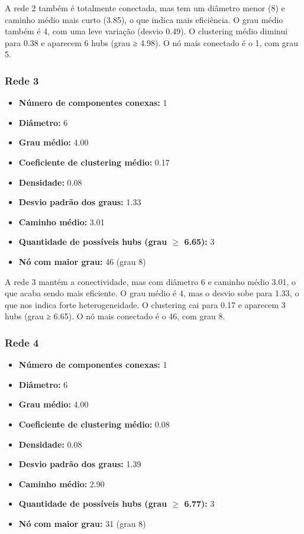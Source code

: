 \documentclass[a4paper]{article}
\begin{document}
A rede 2 também é totalmente conectada, mas tem um diâmetro menor (8) e caminho médio mais curto (3.85), o que indica mais eficiência. O grau médio também é 4, com uma leve variação (desvio 0.49). O clustering médio diminui para 0.38 e aparecem 6 hubs (grau ≥ 4.98). O nó mais conectado é o 1, com grau 5.

\subsubsection{Rede 3}
\begin{itemize}
    \item \textbf{Número de componentes conexas:} 1
    \item \textbf{Diâmetro:} 6
    \item \textbf{Grau médio:} 4.00
    \item \textbf{Coeficiente de clustering médio:} 0.17
    \item \textbf{Densidade:} 0.08
    \item \textbf{Desvio padrão dos graus:} 1.33
    \item \textbf{Caminho médio:} 3.01
    \item \textbf{Quantidade de possíveis hubs (grau $\geq$ 6.65):} 3
    \item \textbf{Nó com maior grau:} 46 (grau 8)
\end{itemize}

A rede 3 mantém a conectividade, mas com diâmetro 6 e caminho médio 3.01, o que acaba sendo mais eficiente. O grau médio é 4, mas o desvio sobe para 1.33, o que nos indica forte heterogeneidade. O clustering cai para 0.17 e aparecem 3 hubs (grau ≥ 6.65). O nó mais conectado é o 46, com grau 8.


\subsubsection{Rede 4}

\begin{itemize}
    \item \textbf{Número de componentes conexas:} 1
    \item \textbf{Diâmetro:} 6
    \item \textbf{Grau médio:} 4.00
    \item \textbf{Coeficiente de clustering médio:} 0.08
    \item \textbf{Densidade:} 0.08
    \item \textbf{Desvio padrão dos graus:} 1.39
    \item \textbf{Caminho médio:} 2.90
    \item \textbf{Quantidade de possíveis hubs (grau $\geq$ 6.77):} 3
    \item \textbf{Nó com maior grau:} 31 (grau 8)
\end{itemize}
\end{document}
